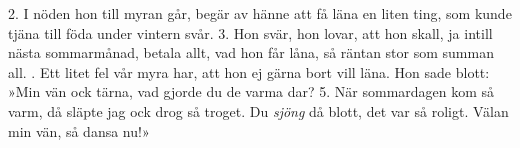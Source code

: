 \setlength{\columnsep}{0.2cm}
\begin{multicols}{2}
2.  I nöden hon till myran går,
    begär av hänne att få läna
    en liten ting, som kunde tjäna
    till föda under vintern svår.
3.  Hon svär, hon lovar, att hon skall,
    ja intill nästa sommarmånad,
    betala allt, vad hon får låna,
    så räntan stor som summan all.
\vfill{}.  Ett litet fel vår myra har,
    att hon ej gärna bort vill läna.
    Hon sade blott: »Min vän ock tärna,
    vad gjorde du de varma dar?
5.  När sommardagen kom så varm,
    då släpte jag ock drog så troget.
    Du \textit{sjöng} då blott, det var så roligt.
    Välan min vän, så dansa nu!»
\end{multicols}
